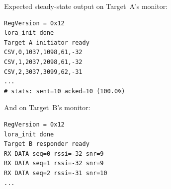 \documentclass[11pt,letterpaper]{article}
\begin{document}
Expected steady-state output on Target~A's monitor:
\begin{verbatim}
RegVersion = 0x12
lora_init done
Target A initiator ready
CSV,0,1037,1098,61,-32
CSV,1,2037,2098,61,-32
CSV,2,3037,3099,62,-31
...
# stats: sent=10 acked=10 (100.0%)
\end{verbatim}
And on Target~B's monitor:
\begin{verbatim}
RegVersion = 0x12
lora_init done
Target B responder ready
RX DATA seq=0 rssi=-32 snr=9
RX DATA seq=1 rssi=-32 snr=9
RX DATA seq=2 rssi=-31 snr=10
...
\end{verbatim}



\newpage
\end{document}
